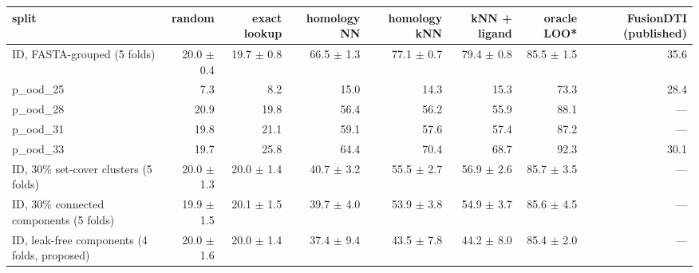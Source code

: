 \begin{tabular}{lrrrrrrr}
\toprule
split & random & exact lookup & homology NN & homology kNN & kNN + ligand & oracle LOO* & FusionDTI (published) \\ \midrule
ID, FASTA-grouped (5 folds) & 20.0 $\pm$ 0.4 & 19.7 $\pm$ 0.8 & 66.5 $\pm$ 1.3 & 77.1 $\pm$ 0.7 & 79.4 $\pm$ 0.8 & 85.5 $\pm$ 1.5 & 35.6 \\
p\_ood\_25 & 7.3 & 8.2 & 15.0 & 14.3 & 15.3 & 73.3 & 28.4 \\
p\_ood\_28 & 20.9 & 19.8 & 56.4 & 56.2 & 55.9 & 88.1 & — \\
p\_ood\_31 & 19.8 & 21.1 & 59.1 & 57.6 & 57.4 & 87.2 & — \\
p\_ood\_33 & 19.7 & 25.8 & 64.4 & 70.4 & 68.7 & 92.3 & 30.1 \\
ID, 30\% set-cover clusters (5 folds) & 20.0 $\pm$ 1.3 & 20.0 $\pm$ 1.4 & 40.7 $\pm$ 3.2 & 55.5 $\pm$ 2.7 & 56.9 $\pm$ 2.6 & 85.7 $\pm$ 3.5 & — \\
ID, 30\% connected components (5 folds) & 19.9 $\pm$ 1.5 & 20.1 $\pm$ 1.5 & 39.7 $\pm$ 4.0 & 53.9 $\pm$ 3.8 & 54.9 $\pm$ 3.7 & 85.6 $\pm$ 4.5 & — \\
ID, leak-free components (4 folds, proposed) & 20.0 $\pm$ 1.6 & 20.0 $\pm$ 1.4 & 37.4 $\pm$ 9.4 & 43.5 $\pm$ 7.8 & 44.2 $\pm$ 8.0 & 85.4 $\pm$ 2.0 & — \\
\bottomrule
\end{tabular}
